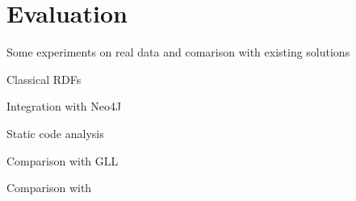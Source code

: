 \section{Evaluation}

Some experiments on real data and comarison with existing solutions

Classical RDFs

Integration with Neo4J

Static code analysis

Comparison with GLL

Comparison with ~\cite{ScalaGraphParsing}